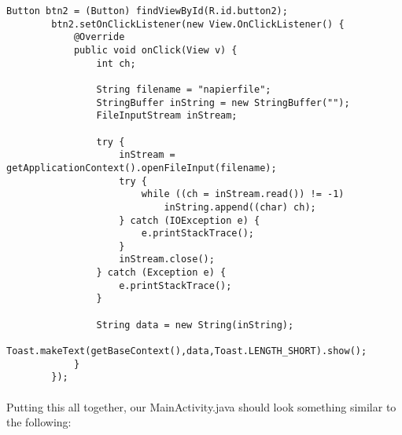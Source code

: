 \begin{lstlisting}
Button btn2 = (Button) findViewById(R.id.button2);
        btn2.setOnClickListener(new View.OnClickListener() {
            @Override
            public void onClick(View v) {
                int ch;

                String filename = "napierfile";
                StringBuffer inString = new StringBuffer("");
                FileInputStream inStream;

                try {
                    inStream = getApplicationContext().openFileInput(filename);
                    try {
                        while ((ch = inStream.read()) != -1)
                            inString.append((char) ch);
                    } catch (IOException e) {
                        e.printStackTrace();
                    }
                    inStream.close();
                } catch (Exception e) {
                    e.printStackTrace();
                }

                String data = new String(inString);
                Toast.makeText(getBaseContext(),data,Toast.LENGTH_SHORT).show();
            }
        });
\end{lstlisting}

\paragraph{} Putting this all together, our MainActivity.java should look something similar to the following:

